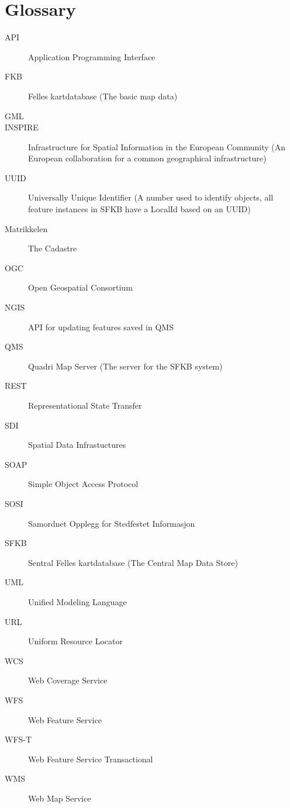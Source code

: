 
\chapter{Glossary}\label{glossary}
\begin{description}
	\item[API] Application Programming Interface
	\item[FKB] Felles kartdatabase (The basic map data)
	\item[GML] 
	\item[INSPIRE] Infrastructure for Spatial Information in the European Community (An European collaboration for a common geographical infrastructure)
	\item[UUID] Universally Unique Identifier (A number used to identify objects, all feature instances in SFKB have a LocalId based on an UUID)
	\item[Matrikkelen] The Cadastre
	\item[OGC] Open Geospatial Consortium
	\item[NGIS] API for updating features saved in QMS
	\item[QMS] Quadri Map Server (The server for the SFKB system)
	\item[REST] Representational State Transfer 
	\item[SDI] Spatial Data Infrastuctures
	\item[SOAP] Simple Object Access Protocol
	\item[SOSI] Samordnet Opplegg for Stedfestet Informasjon
	\item[SFKB] Sentral Felles kartdatabase (The Central Map Data Store)
	\item[UML] Unified Modeling Language
	\item[URL] Uniform Resource Locator
	\item[WCS] Web Coverage Service
	\item[WFS] Web Feature Service
	\item[WFS-T] Web Feature Service Transactional
	\item[WMS] Web Map Service
\end{description}
